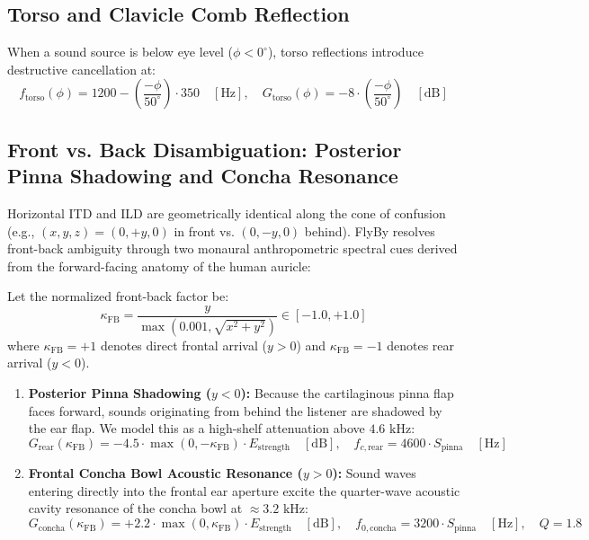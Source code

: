 \documentclass[11pt,a4paper]{article}
\begin{document}
\subsection{Torso and Clavicle Comb Reflection}
When a sound source is below eye level ($\phi < 0^\circ$), torso reflections introduce destructive cancellation at:
\begin{equation}
f_{\text{torso}}(\phi) = 1200 - \left(\frac{-\phi}{50^\circ}\right) \cdot 350 \quad [\text{Hz}], \quad G_{\text{torso}}(\phi) = -8 \cdot \left(\frac{-\phi}{50^\circ}\right) \quad [\text{dB}]
\end{equation}

\subsection{Front vs. Back Disambiguation: Posterior Pinna Shadowing and Concha Resonance}
Horizontal ITD and ILD are geometrically identical along the cone of confusion (e.g., $(x, y, z) = (0, +y, 0)$ in front vs. $(0, -y, 0)$ behind). FlyBy resolves front-back ambiguity through two monaural anthropometric spectral cues derived from the forward-facing anatomy of the human auricle:

Let the normalized front-back factor be:
\begin{equation}
\kappa_{\text{FB}} = \frac{y}{\max(0.001, \sqrt{x^2 + y^2})} \in [-1.0, +1.0]
\end{equation}
where $\kappa_{\text{FB}} = +1$ denotes direct frontal arrival ($y > 0$) and $\kappa_{\text{FB}} = -1$ denotes rear arrival ($y < 0$).

\begin{enumerate}
    \item \textbf{Posterior Pinna Shadowing ($y < 0$):} Because the cartilaginous pinna flap faces forward, sounds originating from behind the listener are shadowed by the ear flap. We model this as a high-shelf attenuation above $4.6\text{ kHz}$:
    \begin{equation}
    G_{\text{rear}}(\kappa_{\text{FB}}) = -4.5 \cdot \max(0, -\kappa_{\text{FB}}) \cdot E_{\text{strength}} \quad [\text{dB}], \quad f_{c,\text{rear}} = 4600 \cdot S_{\text{pinna}} \quad [\text{Hz}]
    \end{equation}
    \item \textbf{Frontal Concha Bowl Acoustic Resonance ($y > 0$):} Sound waves entering directly into the frontal ear aperture excite the quarter-wave acoustic cavity resonance of the concha bowl at $\approx 3.2\text{ kHz}$:
    \begin{equation}
    G_{\text{concha}}(\kappa_{\text{FB}}) = +2.2 \cdot \max(0, \kappa_{\text{FB}}) \cdot E_{\text{strength}} \quad [\text{dB}], \quad f_{0,\text{concha}} = 3200 \cdot S_{\text{pinna}} \quad [\text{Hz}], \quad Q = 1.8
    \end{equation}
\end{enumerate}
\end{document}
